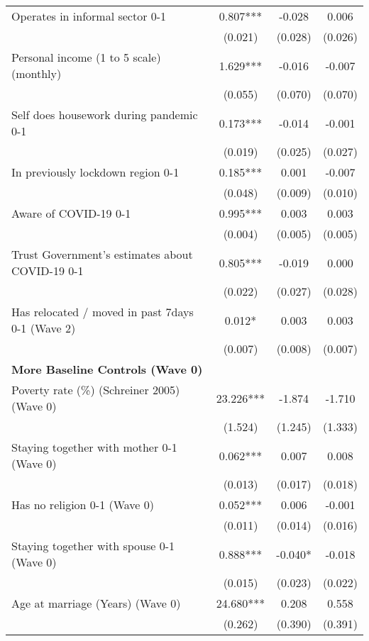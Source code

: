 \begin{ThreePartTable}
\begin{table}[tbp]
\begin{tabular}{lccc}
 Operates in informal sector 0-1 & 0.807*** & -0.028 & 0.006 \\ [0.1em] 
                   &      (0.021)     &      (0.028)     &      (0.026)     \\ [0.1em] 
 Personal income (1 to 5 scale) (monthly) & 1.629*** & -0.016 & -0.007 \\ [0.1em] 
                   &      (0.055)     &      (0.070)     &      (0.070)     \\ [0.1em] 
 Self does housework during pandemic 0-1 & 0.173*** & -0.014 & -0.001 \\ [0.1em] 
                   &      (0.019)     &      (0.025)     &      (0.027)     \\ [0.1em] 
 In previously lockdown region 0-1 & 0.185*** & 0.001 & -0.007 \\ [0.1em] 
                   &      (0.048)     &      (0.009)     &      (0.010)     \\ [0.1em] 
 Aware of COVID-19 0-1 & 0.995*** & 0.003 & 0.003 \\ [0.1em] 
                   &      (0.004)     &      (0.005)     &      (0.005)     \\ [0.1em] 
 Trust Government's estimates about COVID-19 0-1 & 0.805*** & -0.019 & 0.000 \\ [0.1em] 
                   &      (0.022)     &      (0.027)     &      (0.028)     \\ [0.1em] 
 Has relocated / moved in past 7days 0-1 (Wave 2) & 0.012* & 0.003 & 0.003 \\ [0.1em] 
                   &      (0.007)     &      (0.008)     &      (0.007)     \\ [0.1em] 
\textbf{More Baseline Controls (Wave 0)} & & & \\ 
 Poverty rate (\%) (Schreiner 2005) (Wave 0) & 23.226*** & -1.874 & -1.710 \\ [0.1em] 
                   &      (1.524)     &      (1.245)     &      (1.333)     \\ [0.1em] 
 Staying together with mother 0-1 (Wave 0) & 0.062*** & 0.007 & 0.008 \\ [0.1em] 
                   &      (0.013)     &      (0.017)     &      (0.018)     \\ [0.1em] 
 Has no religion 0-1 (Wave 0) & 0.052*** & 0.006 & -0.001 \\ [0.1em] 
                   &      (0.011)     &      (0.014)     &      (0.016)     \\ [0.1em] 
 Staying together with spouse 0-1 (Wave 0) & 0.888*** & -0.040* & -0.018 \\ [0.1em] 
                   &      (0.015)     &      (0.023)     &      (0.022)     \\ [0.1em] 
 Age at marriage (Years) (Wave 0) & 24.680*** & 0.208 & 0.558 \\ [0.1em] 
                   &      (0.262)     &      (0.390)     &      (0.391)     \\ [0.1em] 
\hline\hline
\end{tabular}
\insertTableNotes
\end{table}
\end{ThreePartTable}
